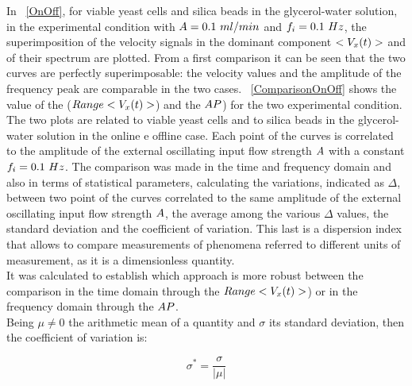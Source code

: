 \documentclass[journal]{IEEEtran}
\theoremstyle{definition}
\theoremstyle{remark}
\begin{document}
In ~\fig\ref{OnOff}, for viable yeast cells and silica beads in the glycerol-water solution, in the experimental condition with $A=0.1~ml/min$ and  $f_i=0.1~Hz$, the superimposition of the velocity signals in the dominant component  $<V_{x}(t)>$ and of their spectrum are plotted.
From a first comparison it can be seen that the two curves are perfectly superimposable: the velocity values and the amplitude of the frequency peak are comparable in the two cases.
~\fig\ref{ComparisonOnOff} shows the value of the ($Range<V_x(t)>$) and the $AP$) for the two experimental condition. The two plots are related to viable yeast cells and to silica beads in the glycerol-water solution in the online e offline case. Each point of the curves is correlated to the amplitude of the external oscillating input flow strength $A$ with a constant $f_i=0.1~Hz$. 
The comparison was made in the time and frequency domain and also in terms of statistical parameters, calculating the variations, indicated as $\Delta$, between two point of the curves correlated to the same amplitude of the external oscillating input flow strength $A$, the average among the various $\Delta$ values, the standard deviation and the coefficient of variation. This last is a dispersion index that allows to compare measurements of phenomena referred to different units of measurement, as it is a dimensionless quantity. 
\\It was calculated to establish which approach is more robust between the comparison in the time domain through the $Range<V_x(t)>$) or in the frequency domain through the $AP$.
\\Being $\mu\neq0$ the arithmetic mean of a quantity and $\sigma$ its standard deviation, then the coefficient of variation is:

\begin{equation}
	\label{eqn:coefficient}
	\sigma^*=\frac{\sigma}{ \left|\mu\right|}
\end{equation}
\end{document}
